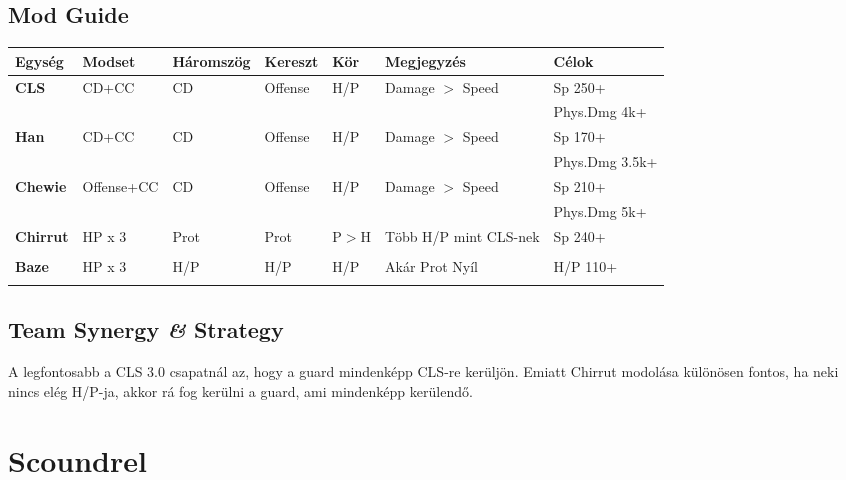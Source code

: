 \documentclass[11pt]{report}
\begin{document}
\section{Mod Guide}
\begin{center}
    \begin{tabular}{|l | l | l | l | l | l | l |}
        \hline
        Egység & Modset & Háromszög & Kereszt & Kör & Megjegyzés & Célok\\ \hline
        \textbf{CLS} & CD+CC & CD & Offense & H/P & Damage $>$ Speed & Sp 250+\\
        &  &  &  &  &  & Phys.Dmg 4k+\\ \hline
        \textbf{Han} & CD+CC & CD & Offense & H/P & Damage $>$ Speed & Sp 170+\\
        &  &  &  &  &  & Phys.Dmg 3.5k+\\ \hline
        \textbf{Chewie} & Offense+CC & CD & Offense & H/P & Damage $>$ Speed & Sp 210+\\ 
        &  &  &  &  &  & Phys.Dmg 5k+\\ \hline
        \textbf{Chirrut} & HP x 3 & Prot & Prot & P$>$H & Több H/P mint CLS-nek & Sp 240+\\
        &  &  &  &  &  & \\ \hline
        \textbf{Baze} & HP x 3 & H/P & H/P & H/P & Akár Prot Nyíl & H/P 110+\\
        &  &  &  &  &  & \\ \hline
    \end{tabular}
\end{center}
\section{Team Synergy \textit{\&} Strategy}
A legfontosabb a CLS 3.0 csapatnál az, hogy a guard mindenképp CLS-re kerüljön. Emiatt Chirrut modolása különösen fontos, ha neki nincs elég H/P-ja, akkor rá fog kerülni a guard, ami mindenképp kerülendő.

\chapter{Scoundrel}
\end{document}
